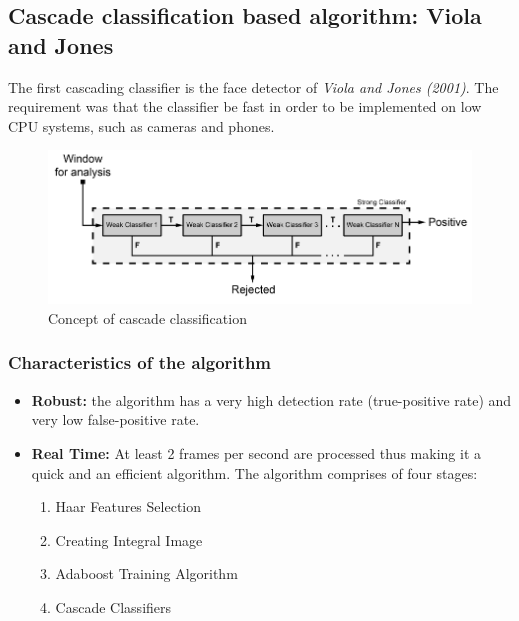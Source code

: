 \documentclass[a4paper,12pt]{report}
\begin{document}
\subsection{Cascade classification based algorithm: Viola and Jones}
   The first cascading classifier is the face detector of \emph{Viola and Jones (2001)}. The requirement was that the classifier be fast in order to be implemented on low CPU systems, such as cameras and phones\cite{wiki_link}.\par
  \begin{figure}[h]
    \centering
    \caption{\label{cascade_concept} Concept of cascade classification\cite{haar_lbp_hog_comp_pdf}}
    \includegraphics[scale=0.55]{cascade_concept.png}
  \end{figure}

\subsubsection{Characteristics of the algorithm}

  \begin{itemize}
      \item \textbf{Robust:} the algorithm has a very high detection rate (true-positive rate) and very low false-positive rate\footnotemark.
      \item \textbf{Real Time:}  At least 2 frames per second are processed thus making it a quick and an efficient algorithm. The algorithm comprises of four stages: 


      \begin{enumerate}
	\item Haar Features Selection 
	\item Creating Integral Image
	\item Adaboost Training Algorithm 
	\item Cascade Classifiers 
      \end{enumerate}

  \end{itemize}
\end{document}
